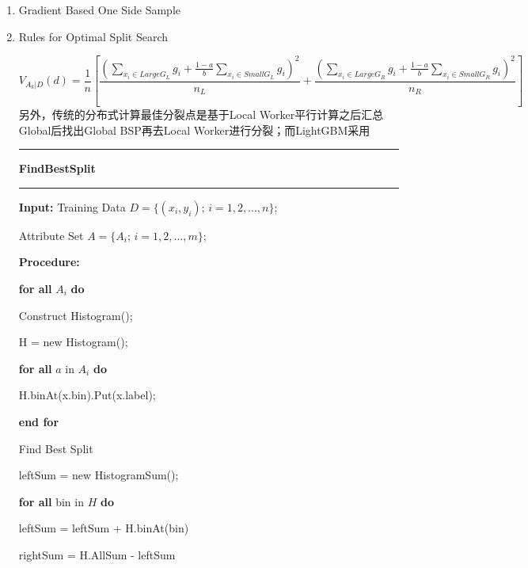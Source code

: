\documentclass[a4paper]{article}
\begin{document}
\begin{enumerate}
			\item Gradient Based One Side Sample\par
			\item Rules for Optimal Split Search\par
				 $$V_{A_k|D}(d) = \frac{1}{n}[\frac{(\sum_{x_i \in LargeG_L}g_i + \frac{1-a}{b}\sum_{x_i \in SmallG_L}g_i)^2}{n_L}
				 					+\frac{(\sum_{x_i \in LargeG_R}g_i + \frac{1-a}{b}\sum_{x_i \in SmallG_R}g_i)^2}{n_R}]$$
				 另外，传统的分布式计算最佳分裂点是基于Local Worker平行计算之后汇总Global后找出Global BSP再去Local Worker进行分裂；而LightGBM采用\par
				\noindent\rule[0.10\baselineskip]{\textwidth}{0.5pt}\par
				\textbf{FindBestSplit}\\
				\noindent\rule[0.10\baselineskip]{\textwidth}{0.5pt}
						\textbf{Input:} Training Data $D=\{(x_i,y_i);\, i = 1,2,\dots, n\}$;\par
						\hspace*{32pt} Attribute Set $A = \{A_i;\,i=1,2,\dots,m\}$;\par
						\textbf{Procedure:}\par
						\hspace*{32pt} \textbf{for all} $A_i$ \textbf{do}\par
						\hspace*{48pt}	Construct Histogram();\par
						\hspace*{48pt}	H = new Histogram();\par
						\hspace*{48pt}  \textbf{for all} $a$ in $A_i$ \textbf{do}\par
						\hspace*{64pt}	H.binAt(x.bin).Put(x.label);\par
						\hspace*{48pt}  \textbf{end for}\par
						\hspace*{48pt}  Find Best Split\par
						\hspace*{48pt}  leftSum = new HistogramSum();\par
						\hspace*{48pt}  \textbf{for all} bin in $H$ \textbf{do}\par
						\hspace*{64pt}  leftSum = leftSum + H.binAt(bin)\par
						\hspace*{64pt}  rightSum = H.AllSum - leftSum\par

\end{enumerate}
\end{document}
